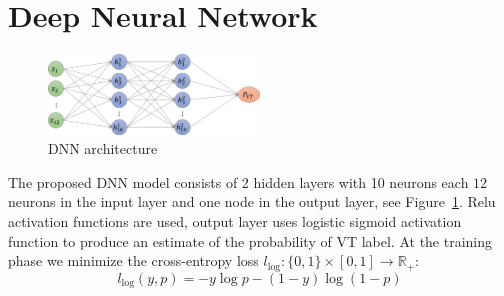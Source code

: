 \section{Deep Neural Network}
\label{sec:dnn}

\begin{figure}[t]
	\centering
	\includegraphics[width=0.5\textwidth]{figures/dnn_graph.png}
	\caption{DNN architecture}
	\label{fig:dnn_graph}
\end{figure}

The proposed DNN model consists of 2 hidden layers with 10 neurons 
each $12$ 
neurons in the input layer and one node in the output layer, see 
Figure~\ref{fig:dnn_graph}.
Relu activation functions are used, output layer uses logistic 
sigmoid activation function to produce an estimate of the probability 
of VT label.
At the training phase we minimize the cross-entropy loss 
$l_{\log}:\{0,1\}\times[0,1]\rightarrow\mathbb{R}_{+}$:
\begin{equation}
l_{\log}(y,p)= -y\log p - (1-y)\log(1-p)
\end{equation}

